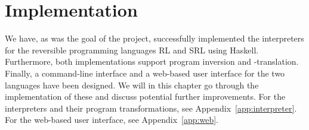 \chapter{Implementation}

We have, as was the goal of the project, successfully implemented the interpreters for the reversible programming languages RL and SRL using Haskell. Furthermore, both implementations support program inversion and -translation. Finally, a command-line interface and a web-based user interface for the two languages have been designed. We will in this chapter go through the implementation of these and discuss potential further improvements. For the interpreters and their program transformations, see Appendix~\ref{app:interpreter}. For the web-based user interface, see Appendix~\ref{app:web}.







